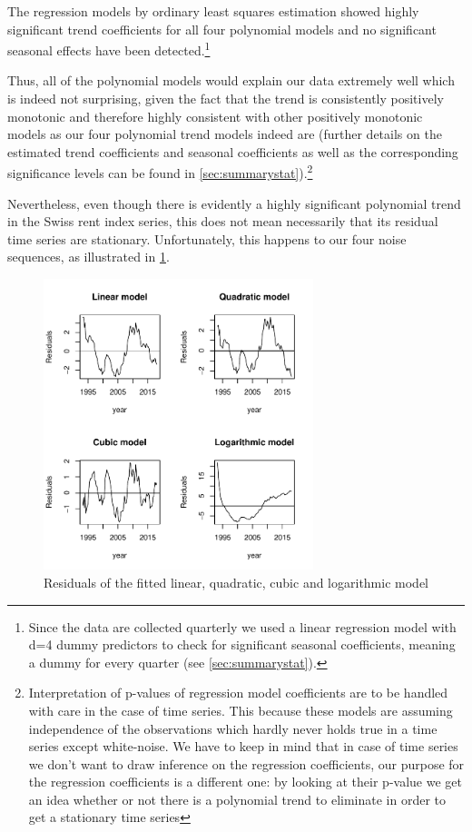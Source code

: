 \documentclass[11pt,a4paper]{article}
\begin{document}
The regression models by ordinary least squares estimation \cite[p.~11]{htf09} showed highly significant trend coefficients for all four polynomial models and no significant seasonal effects have been detected.\footnote{
    Since the data are collected quarterly we used a linear regression model with d=4 dummy predictors to check for significant seasonal coefficients, meaning a dummy for every quarter (see \cref{sec:summarystat}).
}


Thus, all of the polynomial models would explain our data extremely well which is indeed not surprising, given the fact that the trend is consistently positively monotonic and therefore highly consistent with other positively monotonic models as our four polynomial trend models indeed are (further details on the estimated trend coefficients and seasonal coefficients as well as the corresponding significance levels can be found in \cref{sec:summarystat}).\footnote{
    Interpretation of p-values of regression model coefficients are to be handled with care in the case of time series.
    This because these models are assuming independence of the observations which hardly never holds true in a time series except white-noise.
    We have to keep in mind that in case of time series we don't want to draw inference on the regression coefficients, our purpose for the regression coefficients is a different one: by looking at their p-value we get an idea whether or not there is a polynomial trend to eliminate in order to get a stationary time series
}


Nevertheless, even though there is evidently a highly significant polynomial trend in the Swiss rent index series, this does not mean necessarily that its residual time series are stationary.
Unfortunately, this happens to our four noise sequences, as illustrated in \cref{fig:resid_polynomials}.
\begin{figure}
    \centering
    \includegraphics[width=0.7\textwidth]{resid_polynomials}
    \caption{Residuals of the fitted linear, quadratic, cubic and logarithmic model}
    \label{fig:resid_polynomials}
\end{figure}
\end{document}
